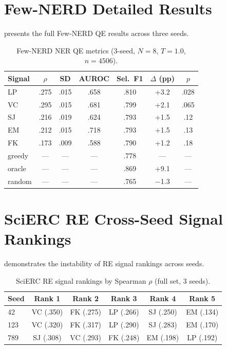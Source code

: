 \documentclass[11pt,a4paper]{article}
\begin{document}
\section{Few-NERD Detailed Results}
\label{app:fewnerd}

 presents the full Few-NERD QE results across three seeds.

\begin{table}[h]
\centering
\small
\caption{Few-NERD NER QE metrics (3-seed, $N{=}8$, $T{=}1.0$, $n{=}4506$).}
\label{tab:fewnerd_full}
\begin{tabular}{lcccccc}
\toprule
\textbf{Signal} & \textbf{$\rho$} & \textbf{SD} & \textbf{AUROC} & \textbf{Sel.\ F1} & \textbf{$\Delta$ (pp)} & \textbf{$p$} \\
\midrule
LP     & .275 & .015 & .658 & .810 & +3.2 & .028 \\
VC     & .295 & .015 & .681 & .799 & +2.1 & .065 \\
SJ     & .216 & .019 & .624 & .793 & +1.5 & .12 \\
EM     & .212 & .015 & .718 & .793 & +1.5 & .13 \\
FK     & .173 & .009 & .588 & .790 & +1.2 & .18 \\
\midrule
greedy & ---  & ---  & ---  & .778 & ---  & --- \\
oracle & ---  & ---  & ---  & .869 & +9.1 & --- \\
random & ---  & ---  & ---  & .765 & $-$1.3 & --- \\
\bottomrule
\end{tabular}
\end{table}

\section{SciERC RE Cross-Seed Signal Rankings}
\label{app:re_seeds}

 demonstrates the instability of RE signal rankings across seeds.

\begin{table}[h]
\centering
\small
\caption{SciERC RE signal rankings by Spearman $\rho$ (full set, 3 seeds).}
\label{tab:re_rankings}
\begin{tabular}{lccccc}
\toprule
\textbf{Seed} & \textbf{Rank 1} & \textbf{Rank 2} & \textbf{Rank 3} & \textbf{Rank 4} & \textbf{Rank 5} \\
\midrule
42  & VC (.350) & FK (.275) & LP (.266) & SJ (.250) & EM (.134) \\
123 & VC (.320) & FK (.317) & LP (.290) & SJ (.283) & EM (.170) \\
789 & SJ (.308) & VC (.293) & FK (.248) & EM (.198) & LP (.192) \\
\bottomrule
\end{tabular}
\end{table}
\end{document}
